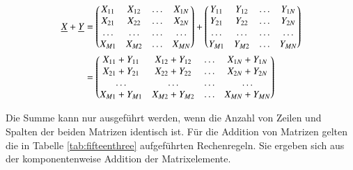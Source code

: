\begin{equation}\label{eq:fifteenten}
\begin{split}
\underline{X} + \underline{Y} & =
\begin{pmatrix}
X_{11} & X_{12} & \dots & X_{1N}\\
X_{21} & X_{22} & \dots & X_{2N}\\
\dots & \dots & \dots & \dots\\
X_{M1} & X_{M2} & \dots & X_{MN}\\
\end{pmatrix} +
\begin{pmatrix}
Y_{11} & Y_{12} & \dots & Y_{1N}\\
Y_{21} & Y_{22} & \dots & Y_{2N}\\
\dots & \dots & \dots & \dots\\
Y_{M1} & Y_{M2} & \dots & Y_{MN}\\
\end{pmatrix} \\
& =
\begin{pmatrix}
X_{11}+Y_{11} & X_{12}+Y_{12} & \dots & X_{1N}+Y_{1N}\\
X_{21}+Y_{21} & X_{22}+Y_{22} & \dots & X_{2N}+Y_{2N}\\
\dots & \dots & \dots & \dots\\
X_{M1}+Y_{M1} & X_{M2}+Y_{M2} & \dots & X_{MN}+Y_{MN}\\
\end{pmatrix}
\end{split}
\end{equation}

\noindent Die Summe kann nur ausgef\"{u}hrt werden, wenn die Anzahl von Zeilen und Spalten der beiden Matrizen identisch ist. F\"{u}r die Addition von Matrizen gelten die in Tabelle \ref{tab:fifteenthree} aufgef\"{u}hrten Rechenregeln. Sie ergeben sich aus der komponentenweise Addition der Matrixelemente.

